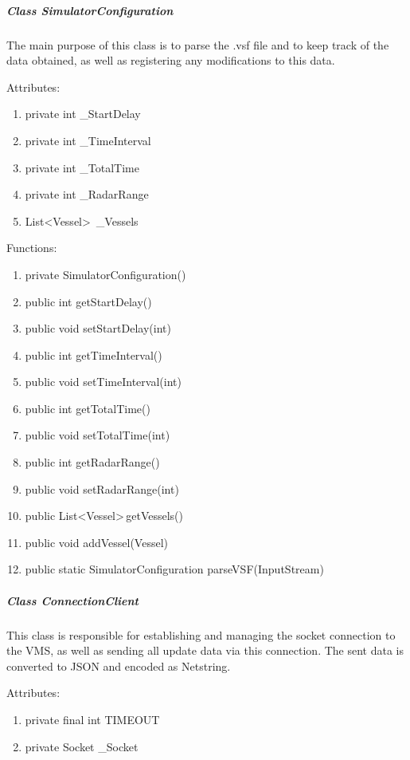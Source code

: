 \documentclass{article}
\begin{document}
\subparagraph{Class SimulatorConfiguration}
The main purpose of this class is to parse the .vsf file and to keep track of the data obtained, as well as registering any modifications to this data.

\vspace{0.5cm}

Attributes:
\begin{enumerate}
    \item private int \_StartDelay
    \item private int \_TimeInterval
    \item private int \_TotalTime
    \item private int \_RadarRange
    \item List\textless Vessel\textgreater \, \_Vessels
\end {enumerate}

\vspace{0.5cm}

Functions:
\begin{enumerate}
	\item private SimulatorConfiguration()
	\item public int getStartDelay()
	\item public void setStartDelay(int)
	\item public int getTimeInterval()
	\item public void setTimeInterval(int)
	\item public int getTotalTime()
	\item public void setTotalTime(int)
	\item public int getRadarRange()
	\item public void setRadarRange(int)
	\item public List\textless Vessel\textgreater  \,getVessels()
	\item public void addVessel(Vessel)
	\item public static SimulatorConfiguration parseVSF(InputStream)
\end{enumerate}

\subparagraph{Class ConnectionClient}
This class is responsible for establishing and managing the socket connection to the VMS, as well as sending all update data via this connection. The sent data is converted to JSON and encoded as Netstring.

\vspace{0.5cm}

Attributes:
\begin{enumerate}
	\item private final int TIMEOUT
    \item private Socket \_Socket
\end {enumerate}
\end{document}
